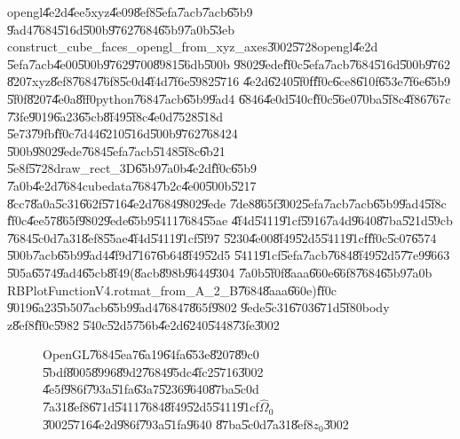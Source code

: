 opengl\U{4e2d}\U{4ee5}xyz\U{4e09}\U{8ef8}\U{5efa}\U{7acb}\U{7acb}\U{65b9}%
\U{9ad4}\U{7684}\U{516d}\U{500b}\U{9762}\U{7684}\U{65b9}\U{7a0b}\U{53eb}%
construct\_cube\_faces\_opengl\_from\_xyz\_axes\U{3002}\U{5728}opengl\U{4e2d}%
\U{5efa}\U{7acb}\U{4e00}\U{500b}\U{9762}\U{9700}\U{8981}\U{56db}\U{500b}%
\U{9802}\U{9ede}\U{ff0c}\U{5efa}\U{7acb}\U{7684}\U{516d}\U{500b}\U{9762}%
\U{8207}xyz\U{8ef8}\U{7684}\U{76f8}\U{5c0d}\U{4f4d}\U{7f6e}\U{5982}\U{5716}%
\U{4e2d}\U{6240}\U{5f0f}\U{ff0c}\U{6ce8}\U{610f}\U{653e}\U{7f6e}\U{65b9}%
\U{5f0f}\U{8207}\U{4e0a}\U{8ff0}python\U{7684}\U{7acb}\U{65b9}\U{9ad4}%
\U{6846}\U{4e0d}\U{540c}\U{ff0c}\U{56e0}\U{70ba}\U{5f8c}\U{4f86}\U{767c}%
\U{73fe}\U{9019}\U{6a23}\U{65cb}\U{8f49}\U{5f8c}\U{4e0d}\U{7528}\U{518d}%
\U{5e73}\U{79fb}\U{ff0c}\U{7d44}\U{6210}\U{516d}\U{500b}\U{9762}\U{7684}24%
\U{500b}\U{9802}\U{9ede}\U{7684}\U{5efa}\U{7acb}\U{5148}\U{5f8c}\U{6b21}%
\U{5e8f}\U{5728}draw\_rect\_3D\U{65b9}\U{7a0b}\U{4e2d}\U{ff0c}\U{65b9}%
\U{7a0b}\U{4e2d}\U{7684}cubedata\U{7684}\U{7b2c}\U{4e00}\U{500b}\U{5217}%
\U{8cc7}\U{8a0a}\U{5c31}\U{662f}\U{5716}\U{4e2d}\U{7684}\U{9802}\U{9ede}%
\U{7de8}\U{865f}\U{3002}\U{5efa}\U{7acb}\U{7acb}\U{65b9}\U{9ad4}\U{5f8c}%
\U{ff0c}\U{4ee5}7\U{865f}\U{9802}\U{9ede}\U{65b9}\U{5411}\U{7684}\U{55ae}%
\U{4f4d}\U{5411}\U{91cf}\U{5916}\U{7a4d}\U{9640}\U{87ba}\U{521d}\U{59cb}%
\U{7684}\U{5c0d}\U{7a31}\U{8ef8}\U{55ae}\U{4f4d}\U{5411}\U{91cf}\U{5f97}%
\U{5230}\U{4e00}\U{8f49}\U{52d5}\U{5411}\U{91cf}\U{ff0c}\U{5c07}\U{6574}%
\U{500b}\U{7acb}\U{65b9}\U{9ad4}\U{4f9d}\U{7167}\U{6b64}\U{8f49}\U{52d5}%
\U{5411}\U{91cf}\U{5efa}\U{7acb}\U{7684}\U{8f49}\U{52d5}\U{77e9}\U{9663}%
\U{505a}\U{6574}\U{9ad4}\U{65cb}\U{8f49}(\U{8acb}\U{898b}\U{9644}\U{9304}%
\U{7a0b}\U{5f0f}\U{8aaa}\U{660e}\U{66f8}\U{7684}\U{65b9}\U{7a0b}%
RBPlotFunctionV4.rotmat\_from\_A\_2\_B\U{7684}\U{8aaa}\U{660e})\U{ff0c}%
\U{9019}\U{6a23}\U{5b50}\U{7acb}\U{65b9}\U{9ad4}\U{7684}7\U{865f}\U{9802}%
\U{9ede}\U{5c31}\U{6703}\U{671d}\U{5f80}body z\U{8ef8}\U{ff0c}\U{5982}%
\U{540c}\U{52d5}\U{756b}\U{4e2d}\U{6240}\U{5448}\U{73fe}\U{3002}

\begin{figure}[th]
\caption{OpenGL\U{7684}\U{5ea7}\U{6a19}\U{64fa}\U{653e}\U{8207}\U{89c0}%
\U{5bdf}\U{8005}\U{8996}\U{89d2}\U{7684}\U{95dc}\U{4fc2}\U{5716}\U{3002}%
\U{4e5f}\U{986f}\U{793a}\U{51fa}\U{63a7}\U{5236}\U{9640}\U{87ba}\U{5c0d}%
\U{7a31}\U{8ef8}\U{671d}\U{5411}\U{7684}\U{8f49}\U{52d5}\U{5411}\U{91cf}$%
\hat{\Omega}_{0}$\U{3002}\U{5716}\U{4e2d}\U{986f}\U{793a}\U{51fa}\U{9640}%
\U{87ba}\U{5c0d}\U{7a31}\U{8ef8}$z_{0}$\U{3002}}
\begin{center}

\end{center}
\end{figure}

%
